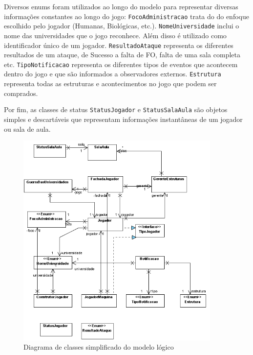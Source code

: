 \documentclass[brazil,times]{abnt}
\begin{document}
Diversos enums foram utilizados ao longo do modelo para
representar diversas informações constantes ao longo do jogo:
\texttt{FocoAdministracao} trata do do enfoque escolhido pelo jogador (Humanas,
Biológicas, etc.). \texttt{NomeUniversidade} inclui o nome das universidades que
o jogo reconhece. Além disso é utilizado como identificador único de um jogador.
\texttt{ResultadoAtaque} representa os diferentes resultados de um ataque, de
Sucesso a falta de FO, falta de uma sala completa etc. \texttt{TipoNotificacao}
representa os diferentes tipos de eventos que acontecem dentro do jogo e que são
informados a observadores externos. \texttt{Estrutura} representa todas as
estruturas e acontecimentos no jogo que podem ser comprados.

Por fim, as classes de status \texttt{StatusJogador} e \texttt{StatusSalaAula}
são objetos simples e descartáveis que representam informações instantâneas de
um jogador ou sala de aula.

\begin{figure}[htp]
\begin{center}
  \includegraphics[width=0.9\textwidth]{imagens/ModeloSimples.png}
  \caption[Diagrama de classes simplificado do modelo lógico]{Diagrama de
  classes simplificado do modelo lógico}
  \label{modelo-simples}
\end{center}
\end{figure}
\end{document}
